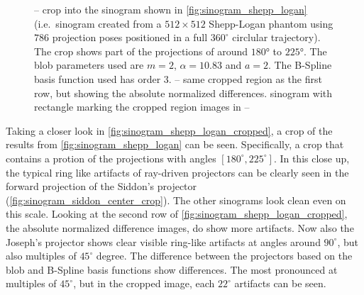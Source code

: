 \begin{figure}
	\caption{--
		crop into the sinogram shown in \autoref{fig:sinogram_shepp_logan} (i.e.\ sinogram
		created from a \(512 \times 512\) Shepp-Logan phantom using \(786\) projection poses
		positioned in a full \(360^\circ\) circlular trajectory). The crop shows part of the
		projections of around \(180\)° to \(225\)°. The blob parameters used are \(m=2\),
		\(\alpha=10.83\) and \(a=2\). The B-Spline basis function used has order \(3\).
		--
		same cropped region as the first row, but showing the absolute normalized
		differences.  sinogram with rectangle marking the
		cropped region images in
		--
	}
	\label{fig:sinogram_shepp_logan_cropped}
\end{figure}

Taking a closer look in \autoref{fig:sinogram_shepp_logan_cropped}, a crop of the results from
\autoref{fig:sinogram_shepp_logan} can be seen. Specifically, a crop that contains a protion of the
projections with angles \([180^\circ, 225^\circ]\). In this close up, the typical ring like
artifacts
of ray-driven projectors can be clearly seen in the forward projection of the Siddon's projector
(\autoref{fig:sinogram_siddon_center_crop}). The other sinograms look clean even on this scale.
Looking at the second row of \autoref{fig:sinogram_shepp_logan_cropped}, the absolute normalized
difference images, do show more artifacts. Now also the Joseph's projector shows clear visible
ring-like artifacts at angles around \(90^\circ\), but also multiples of \(45^\circ\) degree.
The difference between the projectors based on the blob and B-Spline basis functions show
differences. The most pronounced at multiples of \(45^\circ\), but in the cropped image, each
\(22^\circ\) artifacts can be seen.

